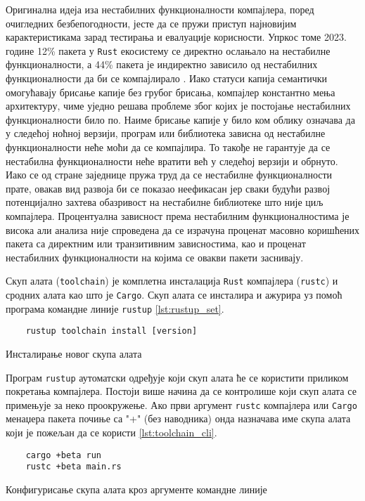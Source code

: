 Оригинална идеја иза нестабилних функционалности компајлера, поред очигледних безбе погодности, 
јесте да се пружи приступ најновијим карактеристикама зарад тестирања и евалуације корисности.
Упркос томе 2023. године 12\%  пакета у \verb|Rust| екосистему се директно ослањало на нестабилне функционалности, а 
44\% пакета је индиректно зависило од нестабилних функционалности да би се компајлирало \cite{unstable-flags}. Иако 
статуси капија семантички омогућавају брисање капије без грубог брисања, компајлер константно мења архитектуру, чиме уједно 
решава проблеме због којих је постојање нестабилних функционалности било по. Наиме брисање капије 
у било ком облику означава да у следећој ноћној верзији, програм или библиотека зависна од нестабилне функционалности
неће моћи да се компајлира. То такође не гарантује да се нестабилна функционалности неће вратити већ у следећој
верзији и обрнуто. Иако се од стране заједнице пружа труд да се нестабилне функционалности прате, овакав вид 
развоја би се показао неефикасан јер сваки будући развој потенцијално захтева обазривост на нестабилне 
библиотеке што није циљ компајлера. Процентуална зависност према нестабилним функционалностима је висока али 
анализа није спроведена да се израчуна проценат масовно коришћених пакета са директним или транзитивним
зависностима, као и проценат нестабилних функционалности на којима се овакви пакети заснивају.

Скуп алата (\verb|toolchain|) је комплетна инсталација \verb|Rust| компајлера (\verb|rustc|) и сродних алата као што 
је \verb|Cargo|. Скуп алата се инсталира и ажурира уз помоћ програма командне линије \verb|rustup| \ref{lst:rustup_set}. 

\begin{listing}[H]
\begin{verbatim}
    rustup toolchain install [version]
\end{verbatim}
\caption{Инсталирање новог скупа алата}
\label{lst:rustup_set}
\end{listing}

Програм \verb|rustup| аутоматски одређује који скуп алата ће се користити приликом покретања компајлера. 
Постоји више начина да се контролише који скуп алата се примењује за неко про окружење.
Ако први аргумент \verb|rustc| компајлера или \verb|Cargo| менаџера пакета почиње са "+" (без наводника) 
онда назначава име скупа алата који је пожељан да се користи \ref{lst:toolchain_cli}. 

\begin{listing}[H]
\begin{verbatim}
    cargo +beta run 
    rustc +beta main.rs
\end{verbatim}
\caption{Конфигурисање скупа алата кроз аргументе командне линије}
\label{lst:toolchain_cli}
\end{listing}

